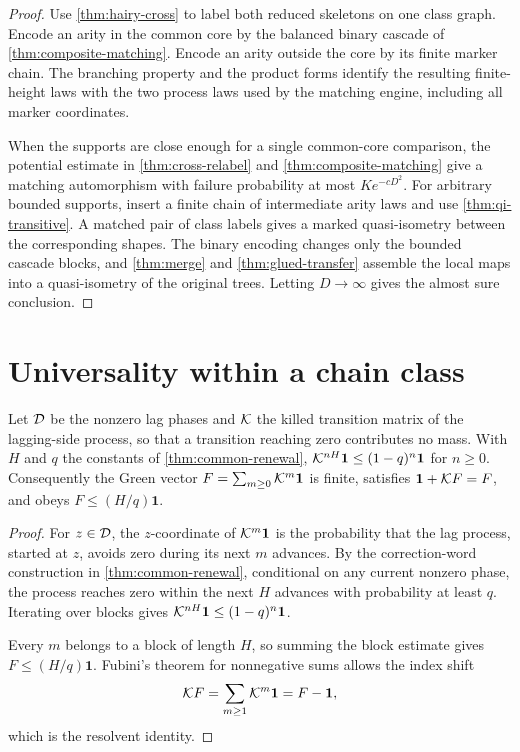 \begin{proof}
\leanok
{}
Use \cref{thm:hairy-cross} to label both reduced skeletons on one class graph. Encode an arity in
the common core by the balanced binary cascade of \cref{thm:composite-matching}. Encode an arity
outside the core by its finite marker chain. The branching property and the product forms identify
the resulting finite-height laws with the two process laws used by the matching engine, including
all marker coordinates.

When the supports are close enough for a single common-core comparison, the potential estimate in
\cref{thm:cross-relabel} and \cref{thm:composite-matching} give a matching automorphism with
failure probability at most $Ke^{-cD^2}$. For arbitrary bounded supports, insert a finite chain
of intermediate arity laws and use \cref{thm:qi-transitive}. A matched pair of class labels gives
a marked quasi-isometry between the corresponding shapes. The binary encoding changes only the
bounded cascade blocks, and \cref{thm:merge} and \cref{thm:glued-transfer} assemble the local maps
into a quasi-isometry of the original trees. Letting $D\to\infty$ gives the almost sure conclusion.
\end{proof}

\section{Universality within a chain class}

\begin{lemma}
\label{thm:renewal-resolvent}
\leanok
Let $\mathcal{D}$ be the nonzero lag phases and $\mathcal{K}$ the killed transition matrix of the lagging-side
process, so that a transition reaching zero contributes no mass. With $H$ and $q$ the constants
of \cref{thm:common-renewal}, $\mathcal{K}^{nH}\mathbf1\leq(1-q)^n\mathbf1$ for $n\geq0$. Consequently
the Green vector $F=\sum_{m\geq0}\mathcal{K}^m\mathbf1$ is finite, satisfies $\mathbf1+\mathcal{K} F=F$, and
obeys $F\leq(H/q)\mathbf1$.
\end{lemma}

\begin{proof}
\leanok
{}
For $z\in\mathcal{D}$, the $z$-coordinate of $\mathcal{K}^m\mathbf1$ is the probability that the lag process,
started at $z$, avoids zero during its next $m$ advances. By the correction-word construction in
\cref{thm:common-renewal}, conditional on any current nonzero phase, the process reaches zero
within the next $H$ advances with probability at least $q$. Iterating over blocks gives
$\mathcal{K}^{nH}\mathbf1\leq(1-q)^n\mathbf1$.

Every $m$ belongs to a block of length $H$, so summing the block estimate gives
$F\leq(H/q)\mathbf1$. Fubini's theorem for nonnegative sums allows the index shift
\[
 \mathcal{K} F=\sum_{m\geq1}\mathcal{K}^m\mathbf1=F-\mathbf1,
\]
which is the resolvent identity.
\end{proof}

